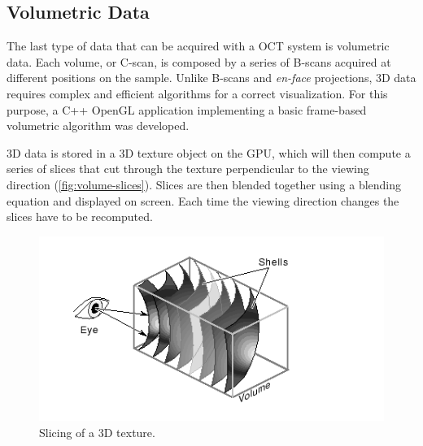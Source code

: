 

\FloatBarrier
\subsection{Volumetric Data}
The last type of data that can be acquired with a OCT system is volumetric data. Each volume, or C-scan, is composed by a series of B-scans acquired at different positions on the sample. Unlike B-scans and \emph{en-face} projections, 3D data requires complex and efficient algorithms for a correct visualization. For this purpose, a C++ OpenGL application implementing a basic frame-based volumetric algorithm was developed.


 3D data is stored in a 3D texture object on the GPU, which will then compute a series of slices that cut through the texture perpendicular to the viewing direction (\autoref{fig:volume-slices}). Slices are then blended together using a blending equation and displayed on screen. Each time the viewing direction changes the slices have to be recomputed. 
  
 \begin{figure}[hbt]
 	\centering
 	\includegraphics[scale=0.5]{gfx/ch4/volume-slices}
 	\caption{Slicing of a 3D texture.}\label{fig:volume-slices}
 \end{figure}
 


